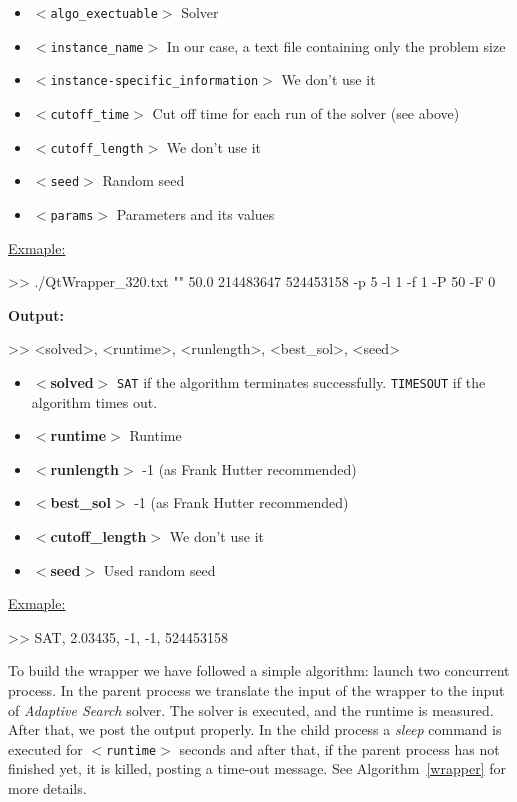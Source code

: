 \begin{itemize}
	\item \texttt{$<$algo\_exectuable$>$} Solver 
	\item \texttt{$<$instance\_name$>$} In our case, a text file containing only the problem size
	\item \texttt{$<$instance-specific\_information$>$} We don't use it 
	\item \texttt{$<$cutoff\_time$>$} Cut off time for each run of the solver (see above)
	\item \texttt{$<$cutoff\_length$>$} We don't use it
	\item \texttt{$<$seed$>$} Random seed
	\item \texttt{$<$params$>$} Parameters and its values
\end{itemize}

\underline{Exmaple:}

\begin{BGVerbatim}
>> ./QtWrapper_320.txt "" 50.0 214483647 524453158 -p 5 -l 1 -f 1 -P 50 -F 0
\end{BGVerbatim}

\textbf{\large Output:} 

\begin{BGVerbatim}
>> <solved>, <runtime>, <runlength>, <best_sol>, <seed>
\end{BGVerbatim}

\begin{itemize}
	\item {\bf $<$solved$>$} \texttt{SAT} if the algorithm terminates successfully. \texttt{TIMESOUT} if the algorithm times out.
	\item {\bf $<$runtime$>$} Runtime
	\item {\bf $<$runlength$>$} -1 (as Frank Hutter recommended)
	\item {\bf $<$best\_sol$>$} -1 (as Frank Hutter recommended)
	\item {\bf $<$cutoff\_length$>$} We don't use it
	\item {\bf $<$seed$>$} Used random seed
\end{itemize}

\underline{Exmaple:}

\begin{BGVerbatim}
>> SAT, 2.03435, -1, -1, 524453158
\end{BGVerbatim}

To build the wrapper we have followed a simple algorithm: launch two concurrent process. In the parent process we translate the input of the wrapper to the input of {\it Adaptive Search} solver. The solver is executed, and the runtime is measured. After that, we post the output properly. In the child process a {\it sleep} command is executed for \texttt{$<$runtime$>$} seconds and after that, if the parent process has not finished yet, it is killed, posting a time-out message. See Algorithm~\ref{wrapper} for more details.

